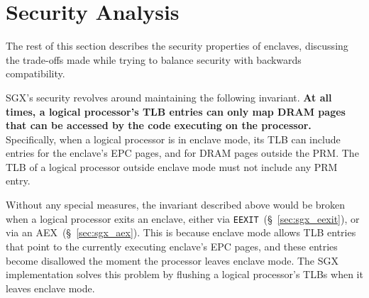 \section{Security Analysis}
\label{sec:security}

The rest of this section describes the security properties of
enclaves, discussing the trade-offs made while trying to balance security with
backwards compatibility.

SGX's security revolves around maintaining the following
invariant. \textbf{At all times, a logical processor's TLB
entries can only map DRAM pages that can be accessed by the code executing on
the processor.} Specifically, when a logical processor is in enclave mode, its
TLB can include entries for the enclave's EPC pages, and for DRAM pages outside
the PRM. The TLB of a logical processor outside enclave mode must not include
any PRM entry.

Without any special measures, the invariant described above would be broken
when a logical processor exits an enclave, either via
\texttt{EEXIT}~(\S~\ref{sec:sgx_eexit}), or via an AEX~(\S~\ref{sec:sgx_aex}).
This is because enclave mode allows TLB entries that point to the currently
executing enclave's EPC pages, and these entries become disallowed the moment
the processor leaves enclave mode. The SGX implementation solves this problem
by flushing a logical processor's TLBs when it leaves enclave mode.




%
%






